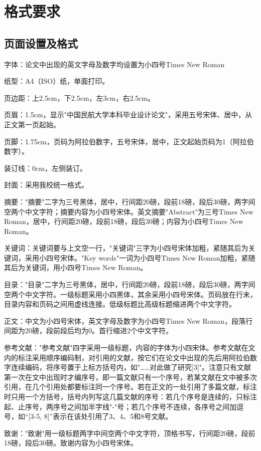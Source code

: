 \documentclass[
	StudentName     = 姓名,
	StudentID       = 学号,
	AdvisorName     = 指导教师,
	Grade           = 年级,
	Major           = 专业,
	Department      = 一个很长很长的名字,
	SubmitYear		= 2022,
	SubmitMonth		= 5,
	Title           = 论文中文题目,
	TitleEng        = {{English Title}}
]{cauc_thesis}
\begin{document}
	\section{格式要求}
	\subsection{页面设置及格式}
	
	字体：论文中出现的英文字母及数字均设置为小四号{\rm Times New Roman}
	
	纸型：A4（ISO）纸，单面打印。
	
	页边距：上2.5cm，下2.5cm，左3cm，右2.5cm。
	
	页眉：1.5cm，显示"中国民航大学本科毕业设计论文"，采用五号宋体、居中，从正文第一页起始。
	
	页脚：1.75cm，页码为阿拉伯数字，五号宋体，居中，正文起始页码为1（阿拉伯数字）。
	
	装订线：0cm，左侧装订。
	
	封面：采用我校统一格式。
	
	摘要："摘要"二字为三号黑体，居中，行间距20磅，段前18磅，段后30磅，两字间空两个中文字符；摘要内容为小四号宋体。英文摘要"Abstract"为三号Times New Roman，居中，行间距20磅，段前18磅，段后30磅；内容为小四号Times New Roman。
	
	关键词：关键词要与上文空一行，"关键词"三字为小四号宋体加粗，紧随其后为关键词，采用小四号宋体。"Key
	words"一词为小四号Times New Roman加粗，紧随其后为关键词，用小四号Times New Roman。
	
	目录："目录"二字为三号黑体，居中，行间距20磅，段前18磅，段后30磅，两字间空两个中文字符。一级标题采用小四黑体，其余采用小四号宋体。页码放在行末，目录内容和页码之间用虚线连接。低级标题比高级标题缩进两个中文字符。
	
	正文：中文为小四号宋体，英文字母及数字为小四号Times New Roman，段落行间距为20磅，段前段后均为0。首行缩进2个中文字符。
	
	参考文献："参考文献"四字采用一级标题，内容的字体为小四宋体。参考文献在文内的标注采用顺序编码制，对引用的文献，按它们在论文中出现的先后用阿拉伯数字连续编码，将序号置于上标方括号内，如"……对此做了研究[3]"。注意只有文献第一次在文中出现时才编序号，即一篇文献只有一个序号，若某文献在文中被多次引用，在几个引用处都要标注同一个序号。若在正文的一处引用了多篇文献，标注时只用一个方括号，括号内列写这几篇文献的序号：若几个序号是连续的，只标注起、止序号，两序号之间加半字线"-"号；若几个序号不连续，各序号之间加逗号，如“[3-5, 8]”表示在该处引用了3、4、5和8号文献。
	
	致谢："致谢"用一级标题两字中间空两个中文字符，顶格书写，行间距20磅，段前18磅，段后30磅。致谢内容为小四号宋体。
	
\end{document}
